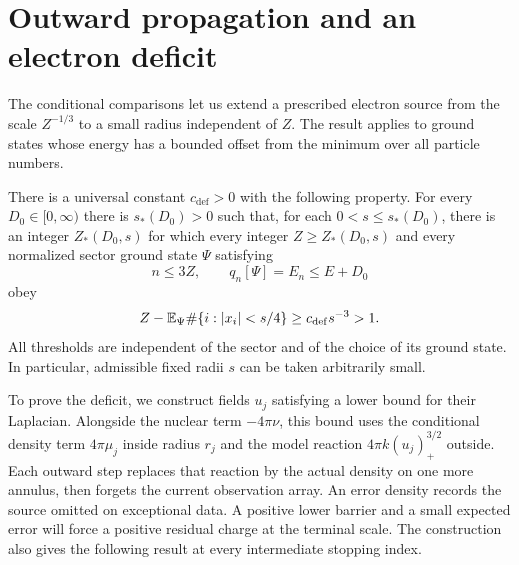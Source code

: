 \section{Outward propagation and an electron deficit}
\label{a:sec:propagation}

The conditional comparisons let us extend a prescribed electron source
from the scale $Z^{-1/3}$ to a small radius independent of $Z$.  The
result applies to ground states whose energy has a bounded offset from
the minimum over all particle numbers.

\begin{proposition}
\label{a:prop:prop-deficit}
There is a universal constant $c_{\mathrm{def}}>0$ with the following
property.  For every $D_0\in[0,\infty)$ there is $s_*(D_0)>0$ such that,
for each $0<s\le s_*(D_0)$, there is an integer $Z_*(D_0,s)$ for which
every integer $Z\ge Z_*(D_0,s)$ and every normalized sector ground state
$\Psi$ satisfying
\[
 n\le3Z,\qquad q_n[\Psi]=E_n\le E+D_0
\]
obey
\begin{equation}
\label{a:eq:prop-deficit}
 Z-\mathbb E_\Psi\#\{i:|x_i|<s/4\}
 \ge c_{\mathrm{def}}s^{-3}>1.
\end{equation}
All thresholds are independent of the sector and of the choice of its
ground state.  In particular, admissible fixed radii $s$ can be taken
arbitrarily small.
\end{proposition}


To prove the deficit, we construct fields $u_j$ satisfying a lower bound
for their Laplacian. Alongside the nuclear term $-4\pi\nu$, this bound
uses the conditional density term $4\pi\mu_j$ inside radius $r_j$ and
the model reaction $4\pi k(u_j)_+^{3/2}$ outside. Each outward step
replaces that reaction by the actual density on one more annulus, then
forgets the current observation array. An error density records the
source omitted on exceptional data. A positive lower barrier and a small
expected error will force a positive residual charge at the terminal
scale. The construction also gives the following result at every
intermediate stopping index.

